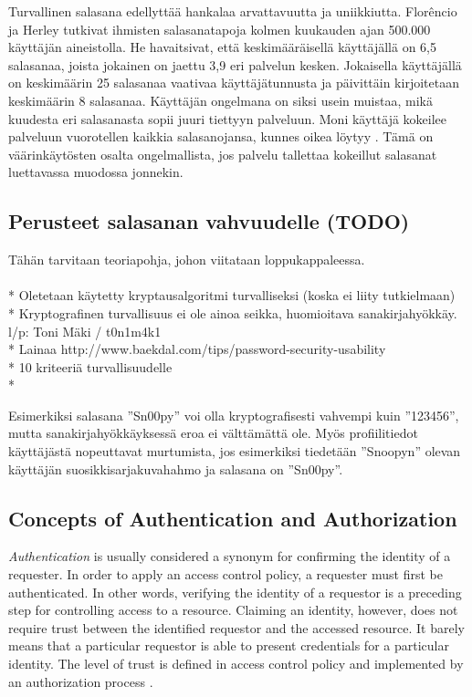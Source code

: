 \documentclass[english,gradu]{tktltiki}
\begin{document}
Turvallinen salasana edellyttää hankalaa arvattavuutta ja uniikkiutta. Florêncio ja Herley \cite{study_of_passwords_07} tutkivat ihmisten salasanatapoja kolmen kuukauden ajan 500.000 käyttäjän aineistolla. He havaitsivat, että keskimääräisellä käyttäjällä on 6,5 salasanaa, joista jokainen on jaettu 3,9 eri palvelun kesken. Jokaisella käyttäjällä on keskimäärin 25 salasanaa vaativaa käyttäjätunnusta ja päivittäin kirjoitetaan keskimäärin 8 salasanaa. Käyttäjän ongelmana on siksi usein muistaa, mikä kuudesta eri salasanasta sopii juuri tiettyyn palveluun. Moni käyttäjä kokeilee palveluun vuorotellen kaikkia salasanojansa, kunnes oikea löytyy \cite{study_of_passwords_07}. Tämä on väärinkäytösten osalta ongelmallista, jos palvelu tallettaa kokeillut salasanat luettavassa muodossa jonnekin.

\subsection{Perusteet salasanan vahvuudelle (TODO)}
Tähän tarvitaan teoriapohja, johon viitataan loppukappaleessa.
 \\
 \\ * Oletetaan käytetty kryptausalgoritmi turvalliseksi (koska ei liity tutkielmaan)
 \\ * Kryptografinen turvallisuus ei ole ainoa seikka, huomioitava sanakirjahyökkäy. l/p: Toni Mäki / t0n1m4k1
 \\ * Lainaa http://www.baekdal.com/tips/password-security-usability
 \\ * 10 kriteeriä turvallisuudelle \cite{schneier_password_advice_09}
 \\ *

 Esimerkiksi salasana ''Sn00py'' voi olla kryptografisesti vahvempi kuin ''123456'', mutta
 sanakirjahyökkäyksessä eroa ei välttämättä ole. Myös profiilitiedot käyttäjästä nopeuttavat murtumista, jos
 esimerkiksi tiedetään ''Snoopyn'' olevan käyttäjän suosikkisarjakuvahahmo ja salasana on ''Sn00py''.


\subsection{Concepts of Authentication and Authorization}

    \emph{Authentication} is usually considered a synonym for confirming the identity of a requester. In order to apply an access control policy, a requester must first be authenticated. In other words, verifying the identity of a requestor is a preceding step for controlling access to a resource. Claiming an identity, however, does not require trust between the identified requestor and the accessed resource. It barely means that a particular requestor is able to present credentials for a particular identity. The level of trust is defined in access control policy and implemented by an authorization process \cite{lampson_distributed_1992}.
\end{document}
